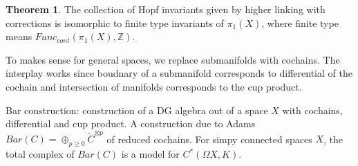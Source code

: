 \documentclass{article}
\theoremstyle{definition}
\newtheorem{theorem}{Theorem}[section]
\theoremstyle{definition}
\theoremstyle{definition}
\theoremstyle{definition}
\theoremstyle{definition}
\theoremstyle{definition}
\theoremstyle{definition}
\begin{document}
\begin{tcolorbox}[colback=red!5!white,colframe=red!30!white]
\begin{theorem}
The collection of Hopf invariants given by higher linking with corrections is isomorphic to finite type invariants of $\pi_1(X)$, where finite type means $Func_{cont}(\pi_1(X), \mathbb{Z})$. 
\end{theorem}
\end{tcolorbox}

To makes sense for general spaces, we replace submanifolds with cochains. The interplay works since boudnary of a submanifold corresponds to differential of the cochain and intersection of manifolds corresponds to the cup product. 

Bar construction: construction of a DG algebra out of a space $X$ with cochains, differential and cup product. A construction due to Adams $Bar(C)=\oplus_{p\geq 0}\tilde{C}^{\otimes p}$ of reduced cochains. For simpy connected spaces $X$, the total complex of $Bar(C)$ is a model for $C^*(\Omega X, K)$. 
\end{document}
